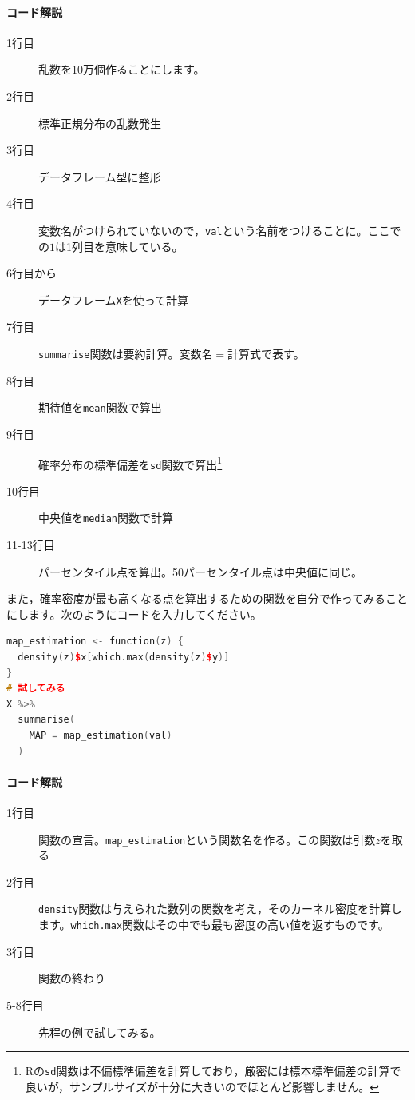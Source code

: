 \documentclass{ltjsbook}
\begin{document}
\paragraph{コード解説}
    \begin{description}
        \item[1行目] 乱数を10万個作ることにします。
        \item[2行目] 標準正規分布の乱数発生
        \item[3行目] データフレーム型に整形
        \item[4行目] 変数名がつけられていないので，\texttt{val}という名前をつけることに。ここでの$1$は1列目を意味している。
        \item[6行目から] データフレーム\texttt{X}を使って計算
        \item[7行目] \texttt{summarise}関数は要約計算。変数名$=$計算式で表す。
        \item[8行目] 期待値を\texttt{mean}関数で算出
        \item[9行目] 確率分布の標準偏差を\texttt{sd}関数で算出\footnote{Rの\texttt{sd}関数は不偏標準偏差を計算しており，厳密には標本標準偏差の計算で良いが，サンプルサイズが十分に大きいのでほとんど影響しません。}
        \item[10行目] 中央値を\texttt{median}関数で計算
        \item[11-13行目] パーセンタイル点を算出。50パーセンタイル点は中央値に同じ。
\end{description}

また，確率密度が最も高くなる点を算出するための関数を自分で作ってみることにします。次のようにコードを入力してください。
\begin{lstlisting}[language=c++,label={code::17_05},caption={確率分布の要約}]
map_estimation <- function(z) {
  density(z)$x[which.max(density(z)$y)]
}
# 試してみる
X %>%
  summarise(
    MAP = map_estimation(val)
  )

\end{lstlisting}
\paragraph{コード解説}
    \begin{description}
        \item[1行目] 関数の宣言。\verb|map_estimation|という関数名を作る。この関数は引数$z$を取る
        \item[2行目] \texttt{density}関数は与えられた数列の関数を考え，そのカーネル密度を計算します。\texttt{which.max}関数はその中でも最も密度の高い値を返すものです。
        \item[3行目] 関数の終わり
        \item[5-8行目] 先程の例で試してみる。
\end{description}
\end{document}
